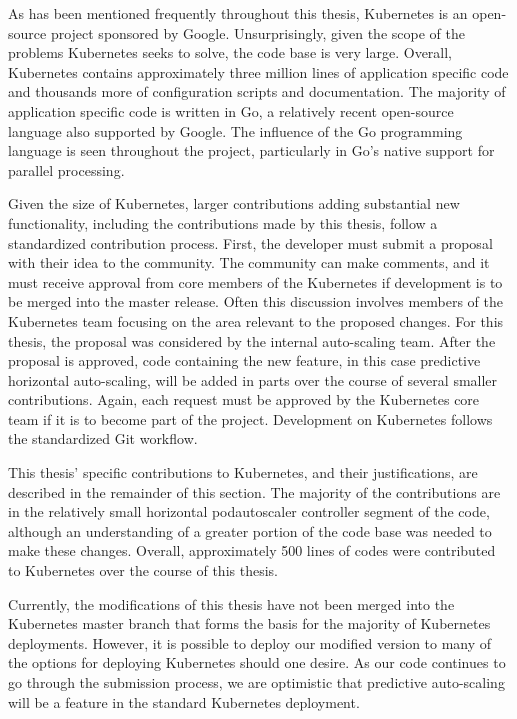 As has been mentioned frequently throughout this thesis, Kubernetes is an
open-source project sponsored by Google. Unsurprisingly, given the scope of the
problems Kubernetes seeks to solve, the code base is very large. Overall,
Kubernetes contains approximately three million lines of application specific
code and thousands more of configuration scripts and documentation. The majority
of application specific code is written in Go, a relatively recent open-source
language also supported by Google. The influence of the Go programming language
is seen throughout the project, particularly in Go's native support for parallel
processing.

Given the size of Kubernetes, larger contributions adding substantial new functionality,
including the contributions made by this thesis, follow a standardized contribution process.
First, the developer must submit a proposal with their idea to the community.
The community can make comments, and it must receive approval from core members
of the Kubernetes if development is to be merged into the master release. Often
this discussion involves members of the Kubernetes team focusing on the area
relevant to the proposed changes. For this thesis, the proposal was considered
by the internal auto-scaling team. After the proposal is approved, code
containing the new feature, in this case predictive horizontal auto-scaling,
will be added in parts over the course of several smaller contributions. Again,
each request must be approved by the Kubernetes core team if it is to become
part of the project. Development on Kubernetes follows the standardized Git workflow.

This thesis' specific contributions to Kubernetes, and their justifications,
are described in the remainder of this section. The majority of the
contributions are in the relatively small horizontal podautoscaler controller
segment of the code, although an understanding of a greater portion of the code
base was needed to make these changes. Overall, approximately 500 lines of codes
were contributed to Kubernetes over the course of this thesis.

Currently, the modifications of this thesis have not been merged into the
Kubernetes master branch that forms the basis for the majority of Kubernetes
deployments. However, it is possible to deploy our modified version to many of
the options for deploying Kubernetes should one desire. As our code continues to
go through the submission process, we are optimistic that predictive
auto-scaling will be a feature in the standard Kubernetes deployment.
